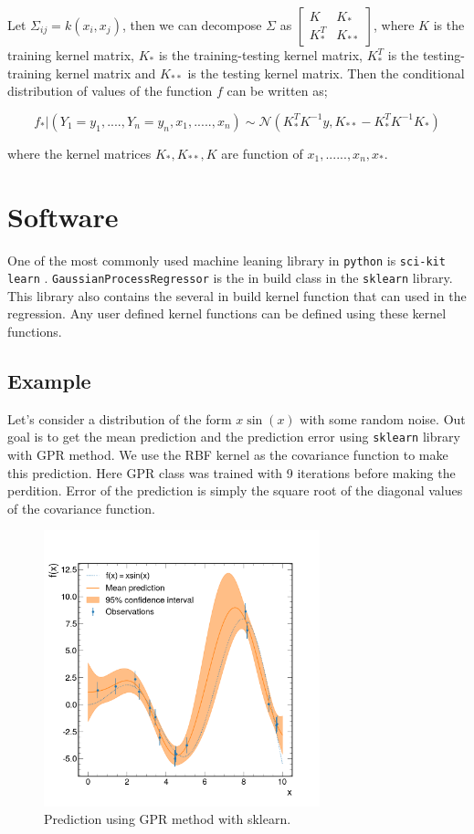 \documentclass{article}
\begin{document}
Let $\Sigma_{ij} = k(x_{i}, x_{j})$, then we can decompose $\Sigma$ as $\begin{bmatrix}
K & K_{*} \\
K_{*}^{T} & K_{**}
\end{bmatrix}$, where $K$ is the training kernel matrix, $K_{*}$ is the training-testing kernel matrix, $K_{*}^{T}$ is the testing-training kernel matrix and $K_{**}$ is the testing kernel matrix. Then the conditional distribution of values of the function $f$ can be written as;

\begin{equation}
f_{*}|(Y_{1} = y_{1},...., Y_{n} = y_{n}, x_{1},.....,x_{n}) \sim \mathcal{N}(K_{*}^{T}K^{-1}y, K_{**} - K_{*}^{T}K^{-1}K_{*})
\end{equation}

where the kernel matrices $K_{*},K_{**},K$ are function of $x_{1},......,x_{n},x_{*}$.

\section{Software}

One of the most commonly used machine leaning library in \verb|python| is \verb|sci-kit learn| \cite{scikit-learn}. \verb|GaussianProcessRegressor| is the in build class in the \verb|sklearn| library. This library also contains the several in build kernel function that can used in the regression. Any user defined kernel functions can be defined using these kernel functions.

\subsection{Example}

Let's consider a distribution of the form $x\sin(x)$ with some random noise. Out goal is to get the mean prediction and the prediction error using \verb|sklearn| library with GPR method. We use the RBF kernel as the covariance function to make this prediction. Here GPR class was trained with 9 iterations before making the perdition. Error of the prediction is simply the square root of the diagonal values of the covariance function.

\begin{figure}
\centering
\includegraphics[width=8.0cm]{imgs/rbf.png}
\caption{Prediction using GPR method with sklearn.}
\label{rbf}
\end{figure}
\end{document}

